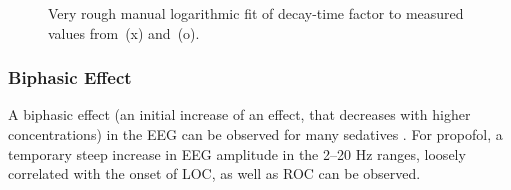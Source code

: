 \begin{figure}[H]
    \centering
    \pgfplotsset{compat = newest}

    \caption{Very rough manual logarithmic fit of decay-time factor to measured values
    from~\cite{kitamura_effects_2003}(x) and~\cite{mcdougall_propofol_2008}(o).}
    \label{fig:lambda_fit}
\end{figure}


\subsubsection{Biphasic Effect}
A biphasic effect (an initial increase of an effect, that decreases with higher concentrations) in the EEG can be
observed for many sedatives \cite{kuizenga_quantitative_1998, kuizenga_biphasic_2001}.
For propofol, a temporary steep increase in EEG amplitude in the 2--20 Hz ranges, loosely correlated with the onset of
LOC, as well as ROC can be observed.


